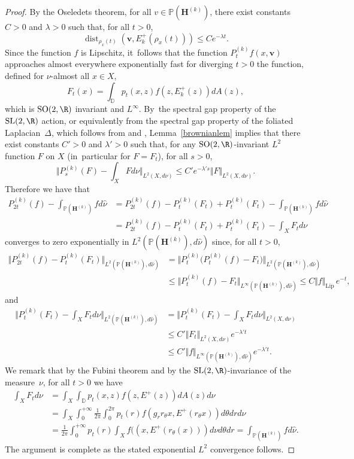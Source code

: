 \documentclass[JEP,XML,SOM,Unicode,published]{cedram}
\DeclareMathOperator{\dist}{dist}
\theoremstyle{plain}
\theoremstyle{definition}
\numberwithin{equation}{subsection}
\newcommand\bD{\mathbb{D}}
\newcommand\bP{\mathbb{P}}
\newcommand{\SL}{\mathrm{SL}}
\newcommand{\SO}{\mathrm{SO}}
\newcommand{\bfH}{\boldsymbol{H}}
\newcommand{\bfv}{\boldsymbol{v}}
\begin{document}
\begin{proof}
By the Oseledets theorem, for all $v \in \bP(\bfH^{(k)})$, there exist constants $C>0$ and $\lambda >0$ such that, for all $t>0$,
\[
\dist_{\rho_x(t)} (\bfv, E^+_k(\rho_{x}(t))) \leq C e^{-\lambda t}.
\]
Since the function $f$ is Lipschitz, it~follows that the function $P^{(k)}_t f(x,\bfv)$ approaches almost everywhere exponentially fast for diverging $t>0$ the function, defined for $\nu$-almost all $x\in X$,
\[
F_t(x) = \int_\bD p_t(x,z) f(z, E^+_k(z))dA(z),
\]
which is $\SO(2,\R)$ invariant and $L^\infty$. By~the spectral gap property of the $\SL(2, \R)$ action, or equivalently from the spectral gap property of the foliated Laplacian~$\Delta$, which follows from \cite{AGY06} and \cite{AG13}, Lemma~\ref{brownianlem} implies that there exist constants $C'>0$ and $\lambda' >0$ such that, for any $\SO(2,\R)$-invariant $L^2$ function $F$ on $X$ (in~particular for $F=F_t$), for all $s >0$,
\[
\biggl\Vert P^{(k)}_s (F) - \int_X F d\nu \biggr\Vert_{L^2(X, d\nu)} \leq C' e^{-\lambda' s} \Vert F \Vert_{L^2(X, d\nu)}.
\]
Therefore we have that
\[
\begin{aligned}
P^{(k)}_{2t} (f) - \int_{\bP(\bfH^{(k)})} f d\hat{\nu} &= P^{(k)}_{2t} (f) - P^{(k)}_t (F_t) + P^{(k)}_t (F_t) - \int_{\bP(\bfH^{(k)})} f d\hat{\nu} \\ &=
P^{(k)}_{2t} (f) - P^{(k)}_t (F_t) + P^{(k)}_t (F_t) - \int_X F_t d\nu
\end{aligned}
\]
converges to zero exponentially in $L^2(\bP(\bfH^{(k)}), d\hat{\nu})$
since, for all $t>0$,
\begin{align*}
\Vert P^{(k)}_{2t} (f) - P^{(k)}_t (F_t) \Vert_{L^2(\bP(\bfH^{(k)}),d\hat{\nu})} &= \Vert P^{(k)}_t \big(P^{(k)}_t(f) - F_t\big) \Vert_{L^2(\bP(\bfH^{(k)}),d\hat{\nu})}\\
&\leq \Vert P^{(k)}_t(f) - F_t \Vert_{L^\infty(\bP(\bfH^{(k)}),d\hat{\nu})} \leq
C \Vert f \Vert_\mathrm{Lip}\, e^{-t},
\end{align*}
and
\[
\begin{aligned}
\biggl\Vert P^{(k)}_t (F_t)- \int_X F_t d\nu \biggr\Vert_{L^2(\bP(\bfH^{(k)}),d\hat{\nu})} &=
\biggl\Vert P^{(k)}_t (F_t) - \int_X F_t d\nu \biggr\Vert_{L^2(X,d\nu)} \\
& \leq C' \Vert F_t \Vert_{L^2(X, d\nu)} e^{-\lambda' t}\\
&\leq C' \Vert f \Vert_{L^\infty(\bP(\bfH^{(k)}), d\hat{\nu})} e^{-\lambda' t}.
\end{aligned}
\]
We remark that by the Fubini theorem and by the $\SL(2,\R)$-invariance of the measure~$\nu$, for all $t>0$ we have
\[
\begin{aligned}
\int_X F_t d\nu&= \int_X \int_\bD p_t(x,z) f(z, E^+(z)) dA(z) d\nu \\ &= \int_X \int_0^{+\infty} \frac{1}{2\pi} \int_0^{2\pi} p_t(r) f(g_r r_\theta x, E^+(r_\theta x)) d\theta dr d\nu \\& = \frac{1}{2\pi} \int_0^{+\infty} p_t(r) \int_X f((x, E^+(r_\theta(x))) d\nu d\theta dr = \int_{\bP(\bfH^{(k)})} f d\hat{\nu}.
\end{aligned}
\]
The argument is complete as the stated exponential $L^2$
convergence follows.
\end{proof}
\end{document}
